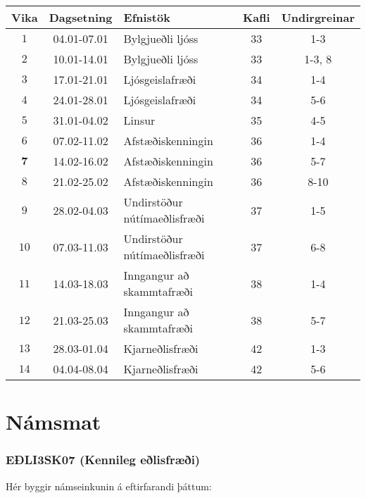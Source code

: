 \begin{table}[H]
    \centering
    \begin{tabular}{|c|c|l|c|c|}
    \hline
       \textbf{Vika}  & \textbf{Dagsetning} & \textbf{Efnistök} & \textbf{Kafli} & \textbf{Undirgreinar}  \\ \hline \hline
        $1$ & 04.01-07.01 & Bylgjueðli ljóss & 33 & 1-3 \\ \hline
        $2$ & 10.01-14.01  &  Bylgjueðli ljóss & 33 & 1-3, 8 \\ \hline
        $3$ & 17.01-21.01 & Ljósgeislafræði & 34 & 1-4 \\ \hline
        $4$ & 24.01-28.01 & Ljósgeislafræði & 34 & 5-6 \\ \hline
        $5$ & 31.01-04.02 & Linsur & 35 & 4-5 \\ \hline
        $6$ & 07.02-11.02 & Afstæðiskenningin & 36 & 1-4 \\ \hline
         $\mathbf{7}$ & 14.02-16.02 & Afstæðiskenningin & 36 & 5-7 \\ \hline
        $8$ & 21.02-25.02 & Afstæðiskenningin & 36 & 8-10 \\ \hline
        $9$ & 28.02-04.03 & Undirstöður nútímaeðlisfræði & 37 & 1-5 \\ \hline
        $10$ & 07.03-11.03 & Undirstöður nútímaeðlisfræði & 37 & 6-8 \\ \hline
        $11$ & 14.03-18.03 & Inngangur að skammtafræði & 38 & 1-4 \\ \hline
        $12$ & 21.03-25.03 & Inngangur að skammtafræði  & 38  & 5-7 \\ \hline
        $13$ & 28.03-01.04  & Kjarneðlisfræði & 42 & 1-3\\ \hline
        $14$ & 04.04-08.04 & Kjarneðlisfræði & 42 & 5-6 \\ \hline
    \end{tabular}
\end{table}

\newpage

\section*{Námsmat}

\subsubsection*{EÐLI3SK07 (Kennileg eðlisfræði)}

Hér byggir námseinkunin á eftirfarandi þáttum:


